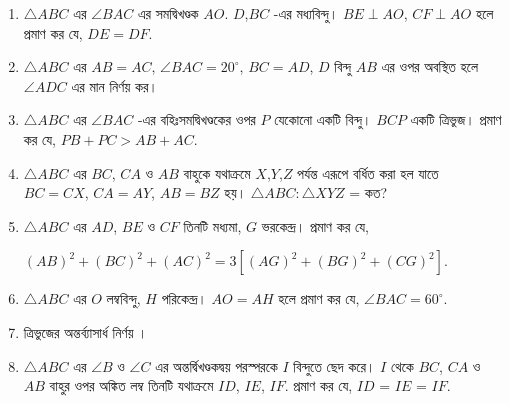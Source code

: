 \documentclass[11pt, a4paper]{article}
\begin{document}
\begin{enumerate}
	 \item $ \bigtriangleup ABC  $ \textbengali{এর} $\angle BAC$ \textbengali{এর সমদ্বিখণ্ডক} $AO$. $D$,$BC$ \textbengali{-এর মধ্যবিন্দু।} $ BE \perp AO $, $ CF \perp AO $ \textbengali{হলে প্রমাণ কর যে,} $ DE = DF $.
	 
	 \item $ \bigtriangleup ABC  $ \textbengali{এর} $ AB = AC $, $ \angle BAC = 20^{\circ} $, $ BC = AD $, $ D $ \textbengali{বিন্দু} $AB$ \textbengali{এর ওপর অবস্থিত হলে} $\angle ADC $ \textbengali{এর মান নির্ণয় কর।}
	 
	 \item $ \bigtriangleup ABC  $ \textbengali{এর} $ \angle BAC $ \textbengali{-এর বহিঃসমদ্বিখণ্ডকের ওপর} $P$ \textbengali{যেকোনো একটি বিন্দু।} $BCP$ \textbengali{একটি ত্রিভুজ।} \textbengali{প্রমাণ কর যে,} $ PB + PC > AB + AC $.
	 
	 \item $ \bigtriangleup ABC  $ 
	 	 \textbengali{এর}
	 	 $BC$, $CA$ 
	 	 \textbengali{ও}
	 	 $AB$
	 	 \textbengali{বাহুকে যথাক্রমে}
	 	 $X$,$Y$,$Z$
	 	 \textbengali{পর্যন্ত এরূপে বর্ধিত করা হল যাতে}
	 	 $BC = CX$, $CA = AY$, $AB = BZ$
	 	 \textbengali{হয়।}
	 	 $ \bigtriangleup ABC : \bigtriangleup XYZ $ =
	 	 \textbengali{কত?}
	 	 
	 
	 \item $ \bigtriangleup ABC $ \textbengali{এর} $AD$, $BE$ \textbengali{ও} $CF$ \textbengali{তিনটি মধ্যমা}, $G$ \textbengali{ভরকেন্দ্র।} \textbengali{প্রমাণ কর যে}, 
	 \begin{center}
	  $ (AB)^2 + (BC)^2 + (AC)^2 = 3[ (AG)^2 + (BG)^2 + (CG)^2 ] $.
	  \end{center}
	 
	 \item $ \bigtriangleup ABC $ \textbengali{এর} $O$ \textbengali{লম্ববিন্দু}, $H$ \textbengali{পরিকেন্দ্র।} $ AO = AH $ \textbengali{হলে প্রমাণ কর যে,} $ \angle BAC = 60^{\circ} $.
	 
	 \item \textbengali{ত্রিভুজের অন্তর্ব্যাসার্ধ নির্ণয় ।}
	
	 \item $ \bigtriangleup ABC $ \textbengali{এর} $ \angle B $ \textbengali{ও} $ \angle C $ \textbengali{এর  অন্তর্দ্বিখণ্ডকদ্বয় পরস্পরকে} $I$ \textbengali{বিন্দুতে ছেদ করে।} $I$ \textbengali{থেকে} $BC$, $CA$ \textbengali{ও} $AB$ \textbengali{বাহুর ওপর অঙ্কিত লম্ব তিনটি যথাক্রমে} $ID$, $IE$, $IF$. \textbengali{প্রমাণ কর যে,} $ID$ = $IE$ = $IF$.
	 

\end{enumerate}
\end{document}
